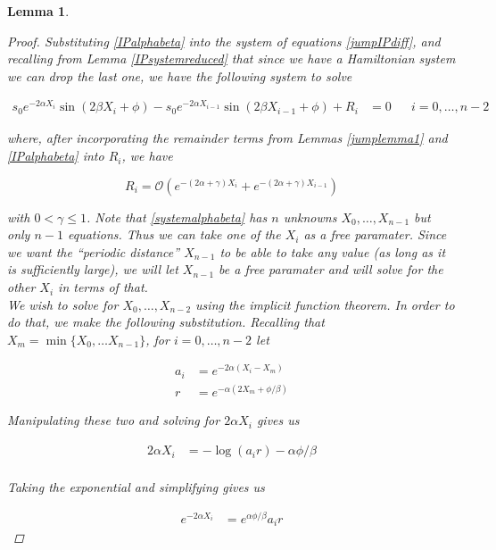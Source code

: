 \documentclass[12pt]{article}
\newtheorem{lemma}{Lemma}
\begin{document}
\begin{lemma}


\begin{proof}
Substituting \eqref{IPalphabeta} into the system of equations \eqref{jumpIPdiff}, and recalling from Lemma \ref{IPsystemreduced} that since we have a Hamiltonian system we can drop the last one, we have the following system to solve

\begin{align}\label{systemalphabeta}
s_0 e^{-2 \alpha X_i} \sin(2 \beta X_i + \phi) - s_0 e^{-2 \alpha X_{i-1}} \sin(2 \beta X_{i-1} + \phi) + R_i &= 0 && i = 0, \dots, n-2
\end{align}

where, after incorporating the remainder terms from Lemmas \ref{jumplemma1} and \ref{IPalphabeta} into $R_i$, we have

\begin{equation}
R_i = \mathcal{O}(e^{-(2 \alpha + \gamma) X_i} + e^{-(2 \alpha + \gamma) X_{i-1}})
\end{equation}

with $0 < \gamma \leq 1$. Note that \eqref{systemalphabeta} has $n$ unknowns $X_0, \dots, X_{n-1}$ but only $n-1$ equations. Thus we can take one of the $X_i$ as a free paramater. Since we want the ``periodic distance'' $X_{n-1}$ to be able to take any value (as long as it is sufficiently large), we will let $X_{n-1}$ be a free paramater and will solve for the other $X_i$ in terms of that.\\

We wish to solve for $X_0, \dots, X_{n-2}$ using the implicit function theorem. In order to do that, we make the following substitution. Recalling that $X_m = \min \{X_0, \dots X_{n-1} \}$, for $i = 0, \dots, n-2$ let

\begin{align}
a_i &= e^{-2 \alpha (X_i - X_m)} \\
r &= e^{-\alpha( 2 X_m + \phi / \beta ) }
\end{align}

Manipulating these two and solving for $2 \alpha X_i$ gives us

\begin{align*}
2 \alpha X_i &= -\log (a_i r) - \alpha \phi / \beta \\
\end{align*}

Taking the exponential and simplifying gives us

\begin{align*}
e^{-2 \alpha X_i} &= e^{\alpha \phi / \beta } a_i r
\end{align*}


\end{proof}
\end{lemma}
\end{document}
